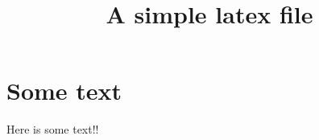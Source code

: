 \documentclass{article}
\begin{document}
\title{A simple latex file}
\date{}
\maketitle

\section{Some text}
Here is some text!!
\end{document}
